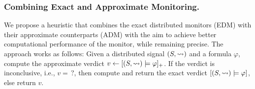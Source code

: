 \subsubsection{Combining Exact and Approximate Monitoring.}
We propose a heuristic that combines the exact distributed monitors (EDM) with their approximate counterparts (ADM) with the aim to achieve better computational performance of the monitor, while remaining precise.
The approach works as follows:
Given a distributed signal $(S,{\rightsquigarrow})$ and a formula $\varphi$, compute the approximate verdict $v \gets [(S,{\rightsquigarrow}) \models \varphi]_+$.
If the verdict is inconclusive, i.e., $v = {\,?}$, then compute and return the exact verdict $[(S,{\rightsquigarrow}) \models \varphi]$, else return $v$.

